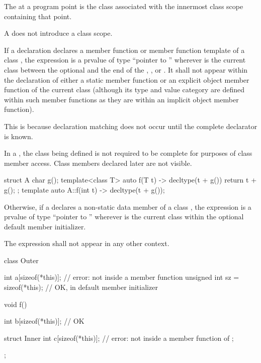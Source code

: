 \pnum
The  at a program point is
the class associated with the innermost class scope containing that point.
\begin{note}
A  does not introduce a class scope.
\end{note}

\pnum
If a declaration declares a member function or member function template of a
class , the expression  is a prvalue of type ``pointer to
 ''
wherever  is the current class
between the optional
 and the end of the ,
, or . It shall not appear within
the declaration of either
a static member function or an explicit object member function
of the current class (although its type and value category
are defined within such member functions as they are within an implicit object
member function).
\begin{note}
This is because declaration matching does not
occur until the complete declarator is known.
\end{note}
\begin{note}
In a ,
the class being defined is not required to be complete
for purposes of class member access.
Class members declared later are not visible.
\begin{example}
\begin{codeblock}
struct A {
  char g();
  template<class T> auto f(T t) -> decltype(t + g())
    { return t + g(); }
};
template auto A::f(int t) -> decltype(t + g());
\end{codeblock}
\end{example}
\end{note}

\pnum
Otherwise, if a  declares a non-static data
member of a class , the expression  is
a prvalue of type ``pointer to ''
wherever  is the current class
within the
optional default member initializer.

\pnum
The expression  shall not appear in any other context.
\begin{example}
\begin{codeblock}
class Outer {
  int a[sizeof(*this)];                 // error: not inside a member function
  unsigned int sz = sizeof(*this);      // OK, in default member initializer

  void f() {
    int b[sizeof(*this)];               // OK

    struct Inner {
      int c[sizeof(*this)];             // error: not inside a member function of 
    };
  }
};
\end{codeblock}
\end{example}

